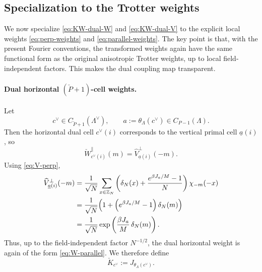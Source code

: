 \subsection{Specialization to the Trotter weights}
\label{sec:KW-Trotter}

We now specialize \eqref{eq:KW-dual-W} and \eqref{eq:KW-dual-V} to the explicit local
weights \eqref{eq:perp-weights} and \eqref{eq:parallel-weights}. The key point is that,
with the present Fourier conventions, the transformed weights again have the same functional
form as the original anisotropic Trotter weights, up to local field-independent factors.
This makes the dual coupling map transparent.

\paragraph{Dual horizontal \((\check P+1)\)-cell weights.}
Let
\begin{equation}
c^\vee\in C_{\check P+1}(\Lambda^\vee),
\qquad
a:=\theta_\Lambda(c^\vee)\in C_{P-1}(\Lambda).
\end{equation}
Then the horizontal dual cell \(c^\vee(i)\) corresponds to the vertical primal cell
\(\underline a(i)\), so
\begin{equation}
	\check W_{c^\vee(i)}^{\parallel}(m)
	=
	\widehat V_{\underline a(i)}^{\perp}(-m).
\end{equation}
Using \eqref{eq:V-perp},
\begin{align}
	\widehat V_{\underline a(i)}^{\perp}(-m)
	&=
	\frac{1}{\sqrt N}\sum_{x\in \mathbb Z_N}
	\left(
	\delta_N(x)+\frac{e^{\beta J_a/M}-1}{N}
	\right)\chi_{-m}(-x)
	\nonumber\\
	&=
	\frac{1}{\sqrt N}
	\Bigl(
	1+\left(e^{\beta J_a/M}-1\right)\delta_N(m)
	\Bigr)
	\nonumber\\
	&=
	\frac{1}{\sqrt N}\exp \left(\frac{\beta J_a}{M}\,\delta_N(m)\right).
	\label{eq:KW-dual-horizontal-W-explicit}
\end{align}
Thus, up to the field-independent factor \(N^{-1/2}\), the dual horizontal weight is again
of the form \eqref{eq:W-parallel}. We therefore define
\begin{equation}
	\check K_{c^\vee}:=J_{\theta_\Lambda(c^\vee)}.
	\label{eq:KW-dual-K-def}
\end{equation}

